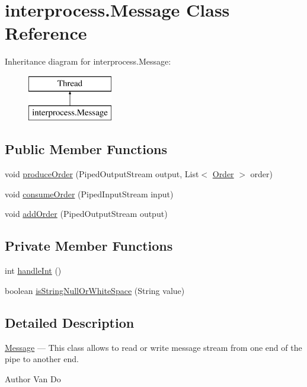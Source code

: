 \hypertarget{classinterprocess_1_1_message}{}\section{interprocess.\+Message Class Reference}
\label{classinterprocess_1_1_message}
Inheritance diagram for interprocess.\+Message\+:\begin{figure}[H]
\begin{center}
\leavevmode
\includegraphics[height=2.000000cm]{classinterprocess_1_1_message}
\end{center}
\end{figure}
\subsection*{Public Member Functions}
\begin{DoxyCompactItemize}
\item 
void \hyperlink{classinterprocess_1_1_message_a753fc2d9bffff59d32d9a20512ac6639}{produce\+Order} (Piped\+Output\+Stream output, List$<$ \hyperlink{classinterprocess_1_1_order}{Order} $>$ order)
\item 
void \hyperlink{classinterprocess_1_1_message_ada4c768cf0688deaede00d43220fd100}{consume\+Order} (Piped\+Input\+Stream input)
\item 
void \hyperlink{classinterprocess_1_1_message_a66e94ca490a4bae0e26db95052aa3956}{add\+Order} (Piped\+Output\+Stream output)
\end{DoxyCompactItemize}
\subsection*{Private Member Functions}
\begin{DoxyCompactItemize}
\item 
int \hyperlink{classinterprocess_1_1_message_a594aec63ced8dc0b7440ceae46e71c52}{handle\+Int} ()
\item 
boolean \hyperlink{classinterprocess_1_1_message_a67f6da8b5552745401b1ab20f3f8a035}{is\+String\+Null\+Or\+White\+Space} (String value)
\end{DoxyCompactItemize}


\subsection{Detailed Description}
\hyperlink{classinterprocess_1_1_message}{Message} --- This class allows to read or write message stream from one end of the pipe to another end. \begin{DoxyAuthor}{Author}
Van Do 
\end{DoxyAuthor}


